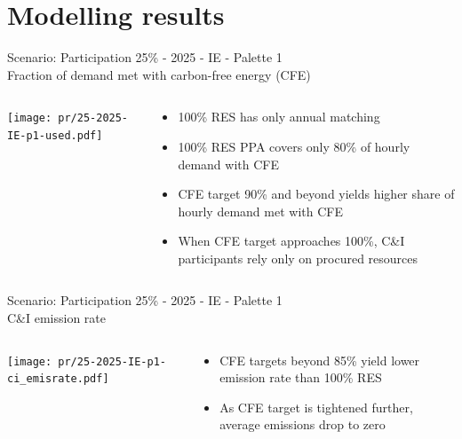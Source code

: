 \section{Modelling results}


\begin{frame}{Scenario: Participation 25\% - 2025 - IE - Palette 1 
\\ Fraction of demand met with carbon-free energy (CFE)}
\begin{columns}[T]
\begin{column}{9cm}
\centering

\texttt{[image: pr/25-2025-IE-p1-used.pdf]}
\end{column}
\begin{column}{5cm}

  \begin{itemize}
  \item 100\% RES has only \alert{annual matching}
  \item 100\% RES PPA covers \alert{only 80\%} of hourly demand with CFE
  \item CFE target \alert{90\%} and beyond yields higher share of hourly demand met with CFE
  \item When CFE target approaches 100\%, C\&I participants rely \alert{only on procured resources}
  \end{itemize}
  
\end{column}
\end{columns}

\end{frame}



\begin{frame}{Scenario: Participation 25\% - 2025 - IE - Palette 1
\\ C\&I emission rate}

\begin{columns}[T]
\begin{column}{9cm}
\centering

\texttt{[image: pr/25-2025-IE-p1-ci\_emisrate.pdf]}
\end{column}
\begin{column}{5cm}

  \vspace{.5cm}

  \begin{itemize}
  \item CFE targets beyond \alert{85\%} yield lower emission rate than 100\% RES 
  \item As CFE target is tightened further, average emissions \alert{drop to zero}
  \end{itemize}
\end{column}
\end{columns}

\end{frame}



